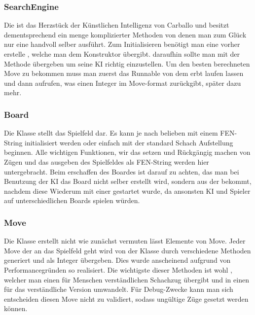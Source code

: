 \subsubsection{SearchEngine}

Die  ist das Herzstück der Künstlichen Intelligenz von 
Carballo und besitzt dementsprechend ein menge komplizierter Methoden von denen 
man zum Glück nur eine handvoll selber ausführt. Zum Initialisieren benötigt man 
eine vorher erstelle , welche man dem Konstruktor übergibt. 
daraufhin sollte man  mit der 
Methode  übergeben um seine KI richtig 
einzustellen. Um den besten berechneten Move zu bekommen muss man zuerst das 
Runnable von dem  erbt laufen lassen und dann 
 aufrufen, was einen Integer im Move-format zurückgibt, 
später dazu mehr.

\subsubsection{Board}

Die Klasse  stellt das Spielfeld dar. Es kann je nach belieben mit 
einem FEN-String initialisiert werden oder einfach mit der standard Schach 
Aufstellung beginnen. Alle wichtigen Funktionen, wir das setzen und Rückgängig 
machen von Zügen und das ausgeben des Spielfeldes als FEN-String werden hier 
untergebracht. Beim erschaffen des Boardes ist darauf zu achten, das man bei 
Benutzung der KI das Board nicht selber erstellt wird, sondern aus der 
 bekommt, nachdem diese Wiederum mit einer  
gestartet wurde, da ansonsten KI und Spieler auf unterschiedlichen Boards 
spielen würden.

\subsubsection{Move}

Die Klasse  erstellt nicht wie zunächst vermuten lässt Elemente von 
Move. Jeder Move der an das Spielfeld geht wird von der Klasse  durch 
verschiedene Methoden generiert und als Integer übergeben. Dies wurde 
anscheinend aufgrund von Performancegründen so realisiert. Die wichtigste dieser 
Methoden ist wohl , welcher man einen für Menschen 
verständlichen Schachzug übergibt und in einen für das  
verständliche Version umwandelt. Für Debug-Zwecke kann man sich entscheiden 
diesen Move nicht zu validiert, sodass ungültige Züge gesetzt werden können.